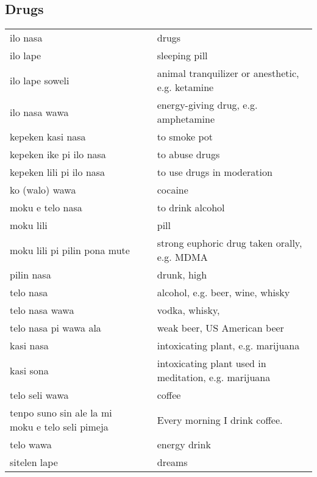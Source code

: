 \subsection{Drugs}
%
\begin{supertabular}{p{4,5cm}|ll}
ilo nasa && drugs \\
ilo lape && sleeping pill \\
ilo lape soweli && animal tranquilizer or anesthetic, e.g. ketamine \\
ilo nasa wawa && energy-giving drug, e.g. amphetamine \\
kepeken kasi nasa && to smoke pot \\
kepeken ike pi ilo nasa && to abuse drugs \\ 
kepeken lili pi ilo nasa && to use drugs in moderation \\
ko (walo) wawa && cocaine \\
moku e telo nasa && to drink alcohol \\
moku lili && pill \\
moku lili pi pilin pona mute && strong euphoric drug taken orally, e.g. MDMA \\
pilin nasa && drunk, high \\
telo nasa && alcohol, e.g. beer, wine, whisky \\
telo nasa wawa && vodka, whisky, \\
telo nasa pi wawa ala && weak beer, US American beer \\
kasi nasa && intoxicating plant, e.g. marijuana \\
kasi sona && intoxicating plant used in meditation, e.g. marijuana \\
telo seli wawa && coffee \\ 
tenpo suno sin ale la mi moku e telo seli pimeja && Every morning I drink coffee. \\
telo wawa && energy drink \\ 
sitelen lape && dreams \\
\end{supertabular} \\
%
%
